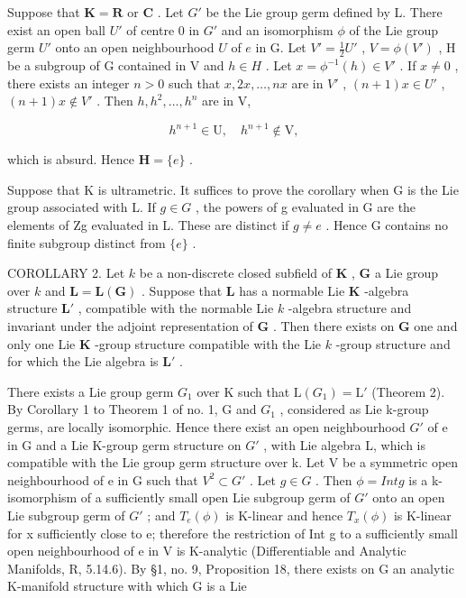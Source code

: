 Suppose that \(\mathbf{K} = \mathbf{R}\) or \(\mathbf{C}\) . Let \(G'\) be the Lie group germ defined by L. There exist an open ball \(U'\) of centre 0 in \(G'\) and an isomorphism \(\phi\) of the Lie group germ \(U'\) onto an open neighbourhood \(U\) of \(e\) in G. Let \(V' = \frac{1}{2} U'\) , \(V = \phi(V')\) , H be a subgroup of G contained in V and \(h \in H\) . Let \(x = \phi^{-1}(h) \in V'\) . If \(x \neq 0\) , there exists an integer \(n > 0\) such that \(x, 2x, \ldots, nx\) are in \(V'\) , \((n + 1)x \in U'\) , \((n + 1)x \notin V'\) . Then \(h, h^2, \ldots, h^n\) are in V,

\[
h ^ {n + 1} \in \mathrm{U}, \quad h ^ {n + 1} \notin \mathrm{V},
\]

which is absurd. Hence \(\mathbf{H} = \{e\}\) .

Suppose that K is ultrametric. It suffices to prove the corollary when G is the Lie group associated with L. If \(g \in G\) , the powers of g evaluated in G are the elements of Zg evaluated in L. These are distinct if \(g \neq e\) . Hence G contains no finite subgroup distinct from \(\{e\}\) .

COROLLARY 2. Let \(k\) be a non-discrete closed subfield of \(\mathbf{K}\) , \(\mathbf{G}\) a Lie group over \(k\) and \(\mathbf{L} = \mathbf{L}(\mathbf{G})\) . Suppose that \(\mathbf{L}\) has a normable Lie \(\mathbf{K}\) -algebra structure \(\mathbf{L}'\) , compatible with the normable Lie \(k\) -algebra structure and invariant under the adjoint representation of \(\mathbf{G}\) . Then there exists on \(\mathbf{G}\) one and only one Lie \(\mathbf{K}\) -group structure compatible with the Lie \(k\) -group structure and for which the Lie algebra is \(\mathbf{L}'\) .

There exists a Lie group germ \(G_{1}\) over K such that \(\mathrm{L}(G_{1}) = \mathrm{L}'\) (Theorem 2). By Corollary 1 to Theorem 1 of no. 1, G and \(G_{1}\) , considered as Lie k-group germs, are locally isomorphic. Hence there exist an open neighbourhood \(G'\) of e in G and a Lie K-group germ structure on \(G'\) , with Lie algebra L, which is compatible with the Lie group germ structure over k. Let V be a symmetric open neighbourhood of e in G such that \(V^{2} \subset G'\) . Let \(g \in G\) . Then \(\phi = Int g\) is a k-isomorphism of a sufficiently small open Lie subgroup germ of \(G'\) onto an open Lie subgroup germ of \(G'\) ; and \(T_{e}(\phi)\) is K-linear and hence \(T_{x}(\phi)\) is K-linear for x sufficiently close to e; therefore the restriction of Int g to a sufficiently small open neighbourhood of e in V is K-analytic (Differentiable and Analytic Manifolds, R, 5.14.6). By §1, no. 9, Proposition 18, there exists on G an analytic K-manifold structure with which G is a Lie

